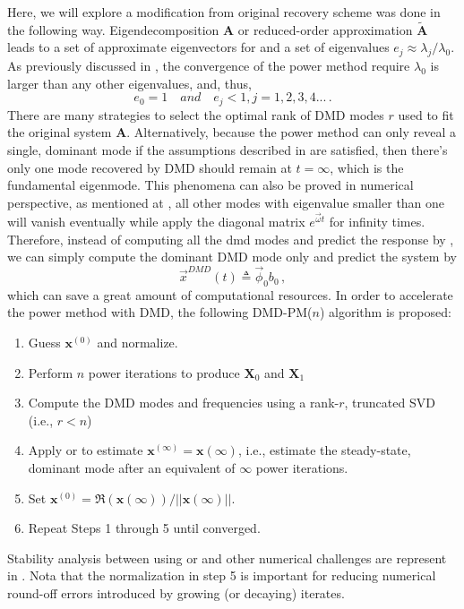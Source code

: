 Here, we will explore a modification from original recovery scheme was done in the following way.
Eigendecomposition $\mathbf{A}$ or reduced-order approximation $\mathbf{\tilde{A}}$ leads to a set of approximate eigenvectors for  and a set of eigenvalues $e_j \approx \lambda_j / \lambda_0$.
As previously discussed in , the convergence of the power method require $\lambda_0$ is larger than any other eigenvalues, and, thus, 
\begin{equation}
\label{eq:ej}
e_0 = 1 \quad and  \quad e_j < 1,j = 1,2,3,4... \, .
\end{equation}
There are many strategies to select the optimal rank of DMD modes $r$ used to fit the original system $\mathbf{A}$. 
Alternatively, because the power method can only reveal a single, dominant mode if the assumptions described in  are satisfied, then there's only one mode recovered by DMD should remain at $t=\infty$, which is the fundamental eigenmode.
This phenomena can also be proved in numerical perspective, as mentioned at , all other modes with eigenvalue smaller than one will vanish eventually while apply the diagonal matrix $e^{\vec{\omega}t}$ for infinity times.
Therefore, instead of computing all the dmd modes and predict the response by , we can simply compute the dominant DMD mode only and predict the system by 
\begin{equation}
\label{eq:f_mode}
\vec{x}^{DMD}(t) \triangleq \vec{\phi}_0 b_0 \, ,
\end{equation}
which can save a great amount of computational resources.
In order to accelerate the power method with DMD, the following DMD-PM($n$) algorithm is proposed:
\begin{enumerate}
 \item Guess $\mathbf{x}^{(0)}$ and normalize.
 \item Perform $n$ power iterations to produce $\mathbf{X}_0$ and $\mathbf{X}_1$
 \item Compute the DMD modes and frequencies using a rank-$r$, truncated  SVD (i.e., $r < n$)
 \item Apply  or  to estimate $\mathbf{x}^{(\infty)}=\mathbf{x}(\infty)$, i.e., estimate the steady-state, dominant mode after an equivalent of $\infty$ power iterations.
 \item Set $\mathbf{x}^{(0)} = \Re(\mathbf{x}(\infty)) / ||\mathbf{x}(\infty)||$.  
 \item Repeat Steps 1 through 5 until converged.
\end{enumerate}
Stability analysis between using  or  and other numerical challenges are represent in .
Nota that the normalization in step 5 is important for reducing numerical round-off errors introduced by growing (or decaying) iterates.  





